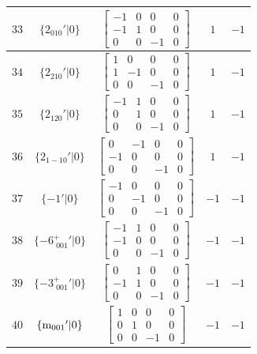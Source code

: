 \documentclass[fleqn,8pt]{jsarticle}
\begin{document}
\begin{longtable}{ccccc}
$ 33 $ & $ \{2{}_{010}{}'|0\} $ & $ \begin{bmatrix} -1 & 0 & 0 & 0 \\ -1 & 1 & 0 & 0 \\ 0 & 0 & -1 & 0 \end{bmatrix} $ & $ 1 $ & $ -1 $ \\ \hline
$ 34 $ & $ \{2{}_{210}{}'|0\} $ & $ \begin{bmatrix} 1 & 0 & 0 & 0 \\ 1 & -1 & 0 & 0 \\ 0 & 0 & -1 & 0 \end{bmatrix} $ & $ 1 $ & $ -1 $ \\ \hline
$ 35 $ & $ \{2{}_{120}{}'|0\} $ & $ \begin{bmatrix} -1 & 1 & 0 & 0 \\ 0 & 1 & 0 & 0 \\ 0 & 0 & -1 & 0 \end{bmatrix} $ & $ 1 $ & $ -1 $ \\ \hline
$ 36 $ & $ \{2{}_{1-10}{}'|0\} $ & $ \begin{bmatrix} 0 & -1 & 0 & 0 \\ -1 & 0 & 0 & 0 \\ 0 & 0 & -1 & 0 \end{bmatrix} $ & $ 1 $ & $ -1 $ \\ \hline
$ 37 $ & $ \{-1{}'|0\} $ & $ \begin{bmatrix} -1 & 0 & 0 & 0 \\ 0 & -1 & 0 & 0 \\ 0 & 0 & -1 & 0 \end{bmatrix} $ & $ -1 $ & $ -1 $ \\ \hline
$ 38 $ & $ \{-6^{+}_{\,\,001}{}'|0\} $ & $ \begin{bmatrix} -1 & 1 & 0 & 0 \\ -1 & 0 & 0 & 0 \\ 0 & 0 & -1 & 0 \end{bmatrix} $ & $ -1 $ & $ -1 $ \\ \hline
$ 39 $ & $ \{-3^{+}_{\,\,001}{}'|0\} $ & $ \begin{bmatrix} 0 & 1 & 0 & 0 \\ -1 & 1 & 0 & 0 \\ 0 & 0 & -1 & 0 \end{bmatrix} $ & $ -1 $ & $ -1 $ \\ \hline
$ 40 $ & $ \{{\rm m}_{001}{}'|0\} $ & $ \begin{bmatrix} 1 & 0 & 0 & 0 \\ 0 & 1 & 0 & 0 \\ 0 & 0 & -1 & 0 \end{bmatrix} $ & $ -1 $ & $ -1 $ \\ \hline

\end{longtable}
\end{document}
